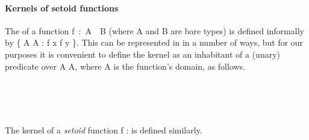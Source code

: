 \paragraph*{Kernels of setoid functions}
The  of a function \ab f~\as :~\ab A~~\ab B (where \ab A and \ab B are
bare types) is defined informally by \{  \ab A  \ab A \as :
\ab f \ab x \as{=} \ab f \ab y \}. This can be represented in \agda in a number of ways,
but for our purposes it is convenient to define the kernel as an inhabitant of a (unary)
predicate over \ab A  \ab A, where \ab A is the function's domain, as follows.

\begin{code}%
\>[0]\<%
\\
\>[0]\AgdaSpace{}%
\AgdaSymbol{:}\AgdaSpace{}%
\AgdaSymbol{\{}\AgdaSpace{}%
\AgdaSymbol{:}\AgdaSpace{}%
\AgdaSpace{}%
\AgdaSymbol{\}\{}\AgdaSpace{}%
\AgdaSymbol{:}\AgdaSpace{}%
\AgdaSpace{}%
\AgdaSymbol{\}}\AgdaSpace{}%
\AgdaSpace{}%
\AgdaSpace{}%
\AgdaSpace{}%
\AgdaSpace{}%
\AgdaSpace{}%
\AgdaSymbol{(}\AgdaSpace{}%
\AgdaSpace{}%
\AgdaSymbol{)}\AgdaSpace{}%
\AgdaSpace{}%
\AgdaSpace{}%
\AgdaSymbol{(}\AgdaSpace{}%
\AgdaSpace{}%
\AgdaSymbol{)}\AgdaSpace{}%
\<%
\\
\>[0]\AgdaSpace{}%
\AgdaSpace{}%
\AgdaSpace{}%
\AgdaSymbol{(}\AgdaSpace{}%
\AgdaOperator{\AgdaInductiveConstructor{,}}\AgdaSpace{}%
\AgdaSymbol{)}\AgdaSpace{}%
\AgdaSymbol{=}\AgdaSpace{}%
\AgdaSpace{}%
\AgdaSpace{}%
\AgdaSpace{}%
\AgdaSpace{}%
\<%
\\
\>[0]\<%
\end{code}
The kernel of a \emph{setoid} function \ab f \as :    is
defined similarly.

